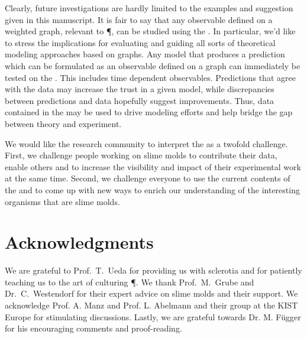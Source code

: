 	Clearly, future investigations are hardly limited to the examples and suggestion given in this manuscript. It is fair to say that any observable defined on a weighted graph, relevant to \P, can be studied using the \data. In particular, we'd like to stress the implications for evaluating and guiding all sorts of theoretical modeling approaches based on graphs. Any model that produces a prediction which can be formulated as an observable defined on a graph can immediately be tested on the \data. This includes time dependent observables. Predictions that agree with the \SMGR data may increase the trust in a given model, while discrepancies between predictions and data hopefully suggest improvements. Thus, data contained in the \data may be used to drive modeling efforts and help bridge the gap between theory and experiment.

	We would like the research community to interpret the \SMGR as a twofold challenge. First, we challenge people working on slime molds to contribute their data, enable others and to increase the visibility and impact of their experimental work at the same time. Second, we challenge everyone to use the current contents of the \SMGR and to come up with new ways to enrich our understanding of the interesting organisms that are slime molds.
	   
\section{Acknowledgments}

	We are grateful to Prof.~T.~Ueda for providing us with sclerotia and for patiently teaching us to the art of culturing \P. We thank Prof.~M.~Grube and Dr.~C.~Westendorf for their expert advice on slime molds and their support. We acknowledge Prof. A. Manz and Prof. L. Abelmann and their group at the KIST Europe for stimulating discussions. Lastly, we are grateful towards Dr. M. F\"ugger for his encouraging comments and proof-reading.
